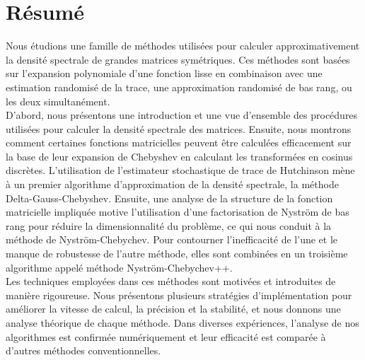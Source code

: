 \chapter*{Résumé}
\label{chp:0-resume}

Nous étudions une famille de méthodes utilisées pour calculer approximativement
la densité spectrale de grandes matrices symétriques. Ces méthodes sont basées
sur l'expansion polynomiale d'une fonction lisse en combinaison avec une estimation randomisé
de la trace, une approximation randomisé de bas rang, ou les deux simultanément.\\

D'abord, nous présentons une introduction et une vue d'ensemble des procédures
utilisées pour calculer la densité spectrale des matrices. Ensuite, nous montrons
comment certaines fonctions matricielles peuvent être calculées efficacement sur
la base de leur expansion de Chebyshev en calculant les transformées en cosinus
discrètes. L'utilisation de l'estimateur stochastique de trace de Hutchinson
mène à un premier algorithme d'approximation de la densité spectrale, la
méthode Delta-Gauss-Chebyshev. Ensuite, une analyse de la structure de la
fonction matricielle impliquée motive l'utilisation d'une factorisation de
Nystr\"om de bas rang pour réduire la dimensionnalité du problème, ce qui
nous conduit à la méthode de Nystr\"om-Chebychev. Pour contourner l'inefficacité
de l'une et le manque de robustesse de l'autre méthode, elles sont combinées en
un troisième algorithme appelé méthode Nystr\"om-Chebychev++.\\

Les techniques employées dans ces méthodes sont motivées et introduites de manière
rigoureuse. Nous présentons plusieurs stratégies d'implémentation pour améliorer
la vitesse de calcul, la précision et la stabilité, et nous donnons une analyse
théorique de chaque méthode. Dans diverses expériences, l'analyse de nos algorithmes
est confirmée numériquement et leur efficacité est comparée à d'autres méthodes
conventionnelles.
